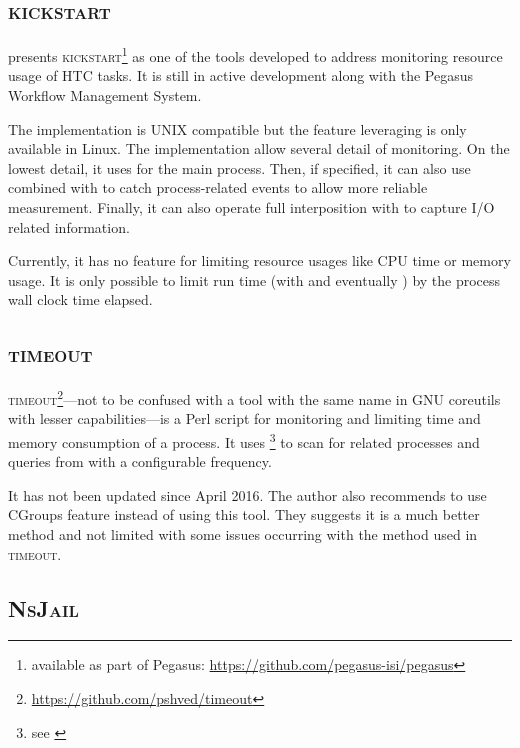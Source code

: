 \subsection{\textsc{kickstart}}

\citet{juvePracticalResourceMonitoring2015} presents \textsc{kickstart}\footnote{available as part of Pegasus: \href{https://github.com/pegasus-isi/pegasus}{https://github.com/pegasus-isi/pegasus}} as one of the tools developed to address monitoring resource usage of HTC tasks.
It is still in active development along with the Pegasus Workflow Management System.

The implementation is UNIX compatible but the feature leveraging  is only available in Linux.
The implementation allow several detail of monitoring.
On the lowest detail, it uses  for the main process.
Then, if specified, it can also use  combined with  to catch process-related events to allow more reliable measurement.
Finally, it can also operate full interposition with  to capture I/O related information.

Currently, it has no feature for limiting resource usages like CPU time or memory usage.
It is only possible to limit run time (with  and eventually ) by the process wall clock time elapsed.


\subsection{\textsc{timeout}}

\textsc{timeout}\footnote{\href{https://github.com/pshved/timeout}{https://github.com/pshved/timeout}}---not to be confused with a tool with the same name in GNU coreutils with lesser capabilities---is a Perl script for monitoring and limiting time and memory consumption of a process.
It uses \footnote{see \href{https://linux.die.net/man/1/ps}{}} to scan for related processes and queries from  with a configurable frequency.

It has not been updated since April 2016.
The author also recommends to use CGroups feature instead of using this tool.
They suggests it is a much better method and not limited with some issues occurring with the method used in \textsc{timeout}.

\subsection{\textsc{NsJail}}
\label{sec:resource.impl.nsjail}

